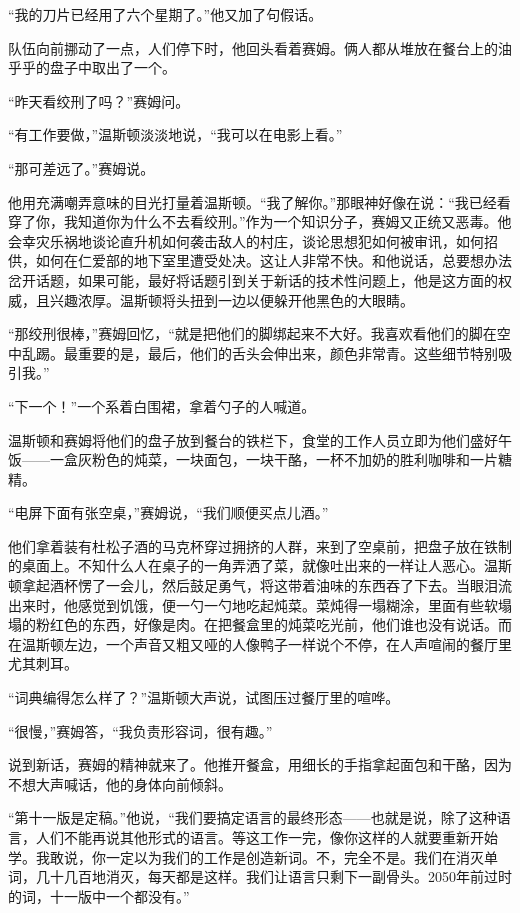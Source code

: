 ``我的刀片已经用了六个星期了。''他又加了句假话。

队伍向前挪动了一点，人们停下时，他回头看着赛姆。俩人都从堆放在餐台上的油乎乎的盘子中取出了一个。

``昨天看绞刑了吗？''赛姆问。

``有工作要做，''温斯顿淡淡地说，``我可以在电影上看。''

``那可差远了。''赛姆说。

他用充满嘲弄意味的目光打量着温斯顿。``我了解你。''那眼神好像在说：``我已经看穿了你，我知道你为什么不去看绞刑。''作为一个知识分子，赛姆又正统又恶毒。他会幸灾乐祸地谈论直升机如何袭击敌人的村庄，谈论思想犯如何被审讯，如何招供，如何在仁爱部的地下室里遭受处决。这让人非常不快。和他说话，总要想办法岔开话题，如果可能，最好将话题引到关于新话的技术性问题上，他是这方面的权威，且兴趣浓厚。温斯顿将头扭到一边以便躲开他黑色的大眼睛。

``那绞刑很棒，''赛姆回忆，``就是把他们的脚绑起来不大好。我喜欢看他们的脚在空中乱踢。最重要的是，最后，他们的舌头会伸出来，颜色非常青。这些细节特别吸引我。''

``下一个！''一个系着白围裙，拿着勺子的人喊道。

温斯顿和赛姆将他们的盘子放到餐台的铁栏下，食堂的工作人员立即为他们盛好午饭——一盒灰粉色的炖菜，一块面包，一块干酪，一杯不加奶的胜利咖啡和一片糖精。

``电屏下面有张空桌，''赛姆说，``我们顺便买点儿酒。''

他们拿着装有杜松子酒的马克杯穿过拥挤的人群，来到了空桌前，把盘子放在铁制的桌面上。不知什么人在桌子的一角弄洒了菜，就像吐出来的一样让人恶心。温斯顿拿起酒杯愣了一会儿，然后鼓足勇气，将这带着油味的东西吞了下去。当眼泪流出来时，他感觉到饥饿，便一勺一勺地吃起炖菜。菜炖得一塌糊涂，里面有些软塌塌的粉红色的东西，好像是肉。在把餐盒里的炖菜吃光前，他们谁也没有说话。而在温斯顿左边，一个声音又粗又哑的人像鸭子一样说个不停，在人声喧闹的餐厅里尤其刺耳。

``词典编得怎么样了？''温斯顿大声说，试图压过餐厅里的喧哗。

``很慢，''赛姆答，``我负责形容词，很有趣。''

说到新话，赛姆的精神就来了。他推开餐盒，用细长的手指拿起面包和干酪，因为不想大声喊话，他的身体向前倾斜。

``第十一版是定稿。''他说，``我们要搞定语言的最终形态——也就是说，除了这种语言，人们不能再说其他形式的语言。等这工作一完，像你这样的人就要重新开始学。我敢说，你一定以为我们的工作是创造新词。不，完全不是。我们在消灭单词，几十几百地消灭，每天都是这样。我们让语言只剩下一副骨头。2050年前过时的词，十一版中一个都没有。''

